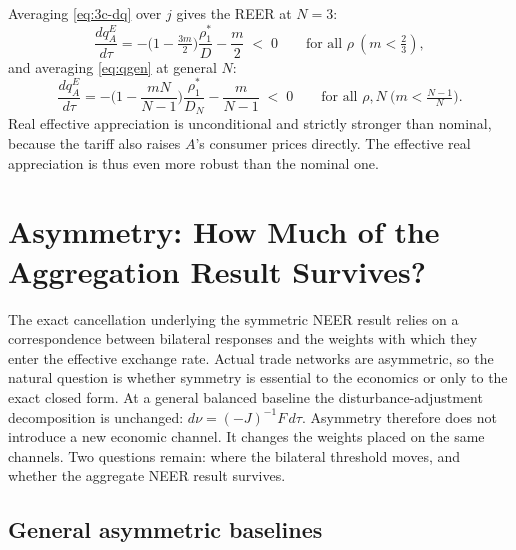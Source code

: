 \documentclass[11pt]{article}
\begin{document}
Averaging \eqref{eq:3c-dq} over $j$ gives the REER at $N = 3$:
\begin{equation}
\frac{dq_A^E}{d\tau} = -\Big(1 - \tfrac{3m}{2}\Big)\frac{\rho_1^*}{D} - \frac{m}{2} \;<\; 0
\qquad \text{for all } \rho \ (m < \tfrac{2}{3}) ,
\label{eq:3c-reer}
\end{equation}
and averaging \eqref{eq:qgen} at general $N$:
\begin{equation}
\frac{dq_A^E}{d\tau}
= -\Big( 1 - \frac{mN}{N-1} \Big) \frac{\rho_1^*}{D_N} - \frac{m}{N-1}
\;<\; 0
\qquad \text{for all } \rho, N \ \big(m < \tfrac{N-1}{N}\big) .
\label{eq:N-reer}
\end{equation}
Real effective appreciation is unconditional and strictly stronger than nominal, because the tariff also raises $A$'s consumer prices directly. The effective real appreciation is thus even more robust than the nominal one.

\section{Asymmetry: How Much of the Aggregation Result Survives?}

The exact cancellation underlying the symmetric NEER result relies on a correspondence between bilateral responses and the weights with which they enter the effective exchange rate. Actual trade networks are asymmetric, so the natural question is whether symmetry is essential to the economics or only to the exact closed form. At a general balanced baseline the disturbance-adjustment decomposition is unchanged: $d\nu = (-J)^{-1}F\, d\tau$. Asymmetry therefore does not introduce a new economic channel. It changes the weights placed on the same channels. Two questions remain: where the bilateral threshold moves, and whether the aggregate NEER result survives.

\subsection{General asymmetric baselines}
\end{document}
